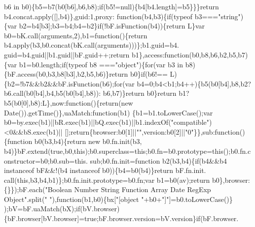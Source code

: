 \begin{DoxyCode}
      b6 in b0)\{b5=b7(b0[b6],b6,b8);\textcolor{keywordflow}{if}(b5!=null)\{b4[b4.length]=b5\}\}\}\textcolor{keywordflow}{return} b4.concat.apply([],b4)\},guid:1,proxy:\textcolor{keyword}{
      function}(b4,b3)\{\textcolor{keywordflow}{if}(typeof b3===\textcolor{stringliteral}{"string"})\{var b2=b4[b3];b3=b4;b4=b2\}\textcolor{keywordflow}{if}(!bF.isFunction(b4))\{\textcolor{keywordflow}{return} 
      L\}var b0=bK.call(arguments,2),b1=\textcolor{keyword}{function}()\{\textcolor{keywordflow}{return} b4.apply(b3,b0.concat(bK.call(arguments)))\};b1.guid=b4.
      guid=b4.guid||b1.guid||bF.guid++;\textcolor{keywordflow}{return} b1\},access:\textcolor{keyword}{function}(b0,b8,b6,b2,b5,b7)\{var b1=b0.length;\textcolor{keywordflow}{if}(typeof b8
      ===\textcolor{stringliteral}{"object"})\{\textcolor{keywordflow}{for}(var b3 in b8)\{bF.access(b0,b3,b8[b3],b2,b5,b6)\}\textcolor{keywordflow}{return} b0\}\textcolor{keywordflow}{if}(b6!==
      L)\{b2=!b7&&b2&&bF.isFunction(b6);\textcolor{keywordflow}{for}(var b4=0;b4<b1;b4++)\{b5(b0[b4],b8,b2?b6.call(b0[b4],b4,b5(b0[b4],b8)):
      b6,b7)\}\textcolor{keywordflow}{return} b0\}\textcolor{keywordflow}{return} b1?b5(b0[0],b8):L\},now:function()\{\textcolor{keywordflow}{return}(\textcolor{keyword}{new} Date()).getTime()\},uaMatch:\textcolor{keyword}{function}(b1)
      \{b1=b1.toLowerCase();var b0=by.exec(b1)||bR.exec(b1)||bQ.exec(b1)||b1.indexOf(\textcolor{stringliteral}{"compatible"})<0&&bS.exec(b1)||
      [];\textcolor{keywordflow}{return}\{browser:b0[1]||\textcolor{stringliteral}{""},version:b0[2]||\textcolor{stringliteral}{"0"}\}\},sub:\textcolor{keyword}{function}()\{\textcolor{keyword}{function} b0(b3,b4)\{\textcolor{keywordflow}{return} \textcolor{keyword}{new} b0.fn.init(b3,
      b4)\}bF.extend(\textcolor{keyword}{true},b0,\textcolor{keyword}{this});b0.superclass=\textcolor{keyword}{this};b0.fn=b0.prototype=\textcolor{keyword}{this}();b0.fn.constructor=b0;b0.sub=this.
      sub;b0.fn.init=\textcolor{keyword}{function} b2(b3,b4)\{\textcolor{keywordflow}{if}(b4&&b4 instanceof bF&&!(b4 instanceof b0))\{b4=b0(b4)\}\textcolor{keywordflow}{return} bF.fn.init.
      call(\textcolor{keyword}{this},b3,b4,b1)\};b0.fn.init.prototype=b0.fn;var b1=b0(av);\textcolor{keywordflow}{return} b0\},browser:\{\}\});bF.each(\textcolor{stringliteral}{"Boolean Number
       String Function Array Date RegExp Object"}.split(\textcolor{stringliteral}{" "}),\textcolor{keyword}{function}(b1,b0)\{bx[\textcolor{stringliteral}{"[object "}+b0+\textcolor{stringliteral}{"]"}]=b0.toLowerCase()\}
      );bV=bF.uaMatch(bX);\textcolor{keywordflow}{if}(bV.browser)\{bF.browser[bV.browser]=\textcolor{keyword}{true};bF.browser.version=bV.version\}\textcolor{keywordflow}{if}(bF.browser.

\end{DoxyCode}
